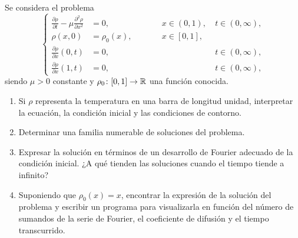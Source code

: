 \documentclass[11pt]{report}
\begin{document}
\begin{exercise}[Junio de 2023]
    Se considera el problema
    \[\left\{\begin{alignedat}{4}
        \frac{\partial \rho}{\partial t}-\mu\frac{\partial^2\rho}{\partial x^2} &= 0, & \qquad & x \in (0,1), \ & t \in (0,\infty), \\
        \rho(x,0) &= \rho_0(x), & \qquad & x \in [0,1], & \\
        \frac{\partial\rho}{\partial x}(0,t) &= 0, & \qquad & \ & t \in (0,\infty), \\
        \frac{\partial\rho}{\partial x}(1,t) &= 0, & \qquad & \ & t \in (0,\infty),
    \end{alignedat}\right.\]
    siendo $\mu > 0$ constante y $\rho_0\colon[0,1]\to\mathbb R$ una función conocida.
    \begin{enumerate}
        \item Si $\rho$ representa la temperatura en una barra de longitud unidad, interpretar la ecuación, la condición inicial y las condiciones de contorno.
        \item Determinar una familia numerable de soluciones del problema.
        \item Expresar la solución en términos de un desarrollo de Fourier adecuado de la condición inicial. ¿A qué tienden las soluciones cuando el tiempo tiende a infinito?
        \item Suponiendo que $\rho_0(x) = x$, encontrar la expresión de la solución del problema y escribir un programa para visualizarla en función del número de sumandos de la serie de Fourier, el coeficiente de difusión y el tiempo transcurrido.
    \end{enumerate}
\end{exercise}
\end{document}
